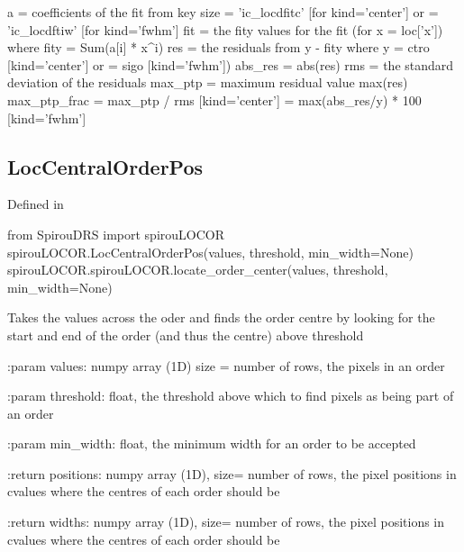 \begin{minipage}{\textwidth}
\begin{pythondocstring}
        a = coefficients of the fit from key
        size = 'ic_locdfitc' [for kind='center'] or
             = 'ic_locdftiw' [for kind='fwhm']
        fit = the fity values for the fit (for x = loc['x'])
            where fity = Sum(a[i] * x^i)
        res = the residuals from y - fity
             where y = ctro [kind='center'] or 
                     = sigo [kind='fwhm'])
        abs_res = abs(res)
        rms = the standard deviation of the residuals
        max_ptp = maximum residual value max(res)
        max_ptp_frac = max_ptp / rms  [kind='center']
                     = max(abs_res/y) * 100   [kind='fwhm']
\end{pythondocstring}
\end{minipage}

\noindent\begin{minipage}{\textwidth}
\subsection{LocCentralOrderPos}

Defined in \spirouLOCOR{}

\begin{pythonbox}
from SpirouDRS import spirouLOCOR
spirouLOCOR.LocCentralOrderPos(values, threshold, min_width=None)
spirouLOCOR.spirouLOCOR.locate_order_center(values, threshold, min_width=None)
\end{pythonbox}

\begin{pythondocstring}
Takes the values across the oder and finds the order centre by looking for
the start and end of the order (and thus the centre) above threshold

:param values: numpy array (1D) size = number of rows, the pixels in an
                order

:param threshold: float, the threshold above which to find pixels as being
                  part of an order

:param min_width: float, the minimum width for an order to be accepted

:return positions: numpy array (1D), size= number of rows,
                   the pixel positions in cvalues where the centres of each
                   order should be

:return widths:    numpy array (1D), size= number of rows,
                   the pixel positions in cvalues where the centres of each
                   order should be
\end{pythondocstring}
\end{minipage}

